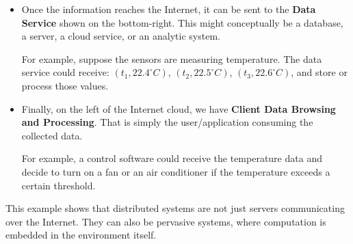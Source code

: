 \begin{examplebox}
\begin{itemize}
        \item Once the information reaches the Internet, it can be sent to the \textbf{Data Service} shown on the bottom-right. This might conceptually be a database, a server, a cloud service, or an analytic system.

            For example, suppose the sensors are measuring temperature. The data service could receive: $(t_1, 22.4^\circ C)$, $(t_2, 22.5^\circ C)$, $(t_3, 22.6^\circ C)$, and store or process those values.

        \item Finally, on the left of the Internet cloud, we have \textbf{Client Data Browsing and Processing}. That is simply the user/application consuming the collected data.

            For example, a control software could receive the temperature data and decide to turn on a fan or an air conditioner if the temperature exceeds a certain threshold.
    \end{itemize}
    This example shows that distributed systems are not just servers communicating over the Internet. They can also be pervasive systems, where computation is embedded in the environment itself.
\end{examplebox}


